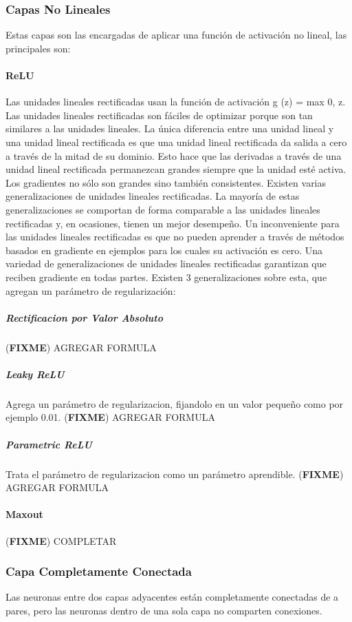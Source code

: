 \documentclass[a4paper,11pt,spanish]{book}
\newcommand*{\FIXME}[1]{{(\textbf{FIXME}) {#1}}}
\begin{document}
      \subsubsection{Capas No Lineales}
	Estas capas son las encargadas de aplicar una función de activación no lineal, las principales son:
	\paragraph{ReLU} Las unidades lineales rectificadas usan la función de activación g (z) = max {0, z}. 
	Las unidades lineales rectificadas son fáciles de optimizar porque son tan similares a las unidades lineales. 
	La única diferencia entre una unidad lineal y una unidad lineal rectificada es que una unidad lineal rectificada da salida a cero a través de la mitad de su dominio. 
	Esto hace que las derivadas a través de una unidad lineal rectificada permanezcan grandes siempre que la unidad esté activa.
	Los gradientes no sólo son grandes sino también consistentes.
	Existen varias generalizaciones de unidades lineales rectificadas. La mayoría de estas generalizaciones se comportan de forma comparable a las unidades lineales rectificadas
	y, en ocasiones, tienen un mejor desempeño. Un inconveniente para las unidades lineales rectificadas es que no pueden aprender a través de métodos basados ​​en 
	gradiente en ejemplos para los cuales su activación es cero. Una variedad de generalizaciones de unidades lineales rectificadas garantizan que reciben gradiente en 
	todas partes. Existen 3 generalizaciones sobre esta, que agregan un parámetro de regularización:
	  \subparagraph{Rectificacion por Valor Absoluto} \FIXME{AGREGAR FORMULA}
	  \subparagraph{Leaky ReLU} Agrega un parámetro de regularizacion, fijandolo en un valor pequeño como por ejemplo 0.01. \FIXME{AGREGAR FORMULA}
	  \subparagraph{Parametric ReLU} Trata el parámetro de regularizacion como un parámetro aprendible. \FIXME{AGREGAR FORMULA}
	\paragraph{Maxout} \FIXME{COMPLETAR}
	
      
      \subsubsection{Capa Completamente Conectada} 
	Las neuronas entre dos capas adyacentes están completamente conectadas de a pares, pero las neuronas dentro de una sola capa no comparten conexiones.
\end{document}
